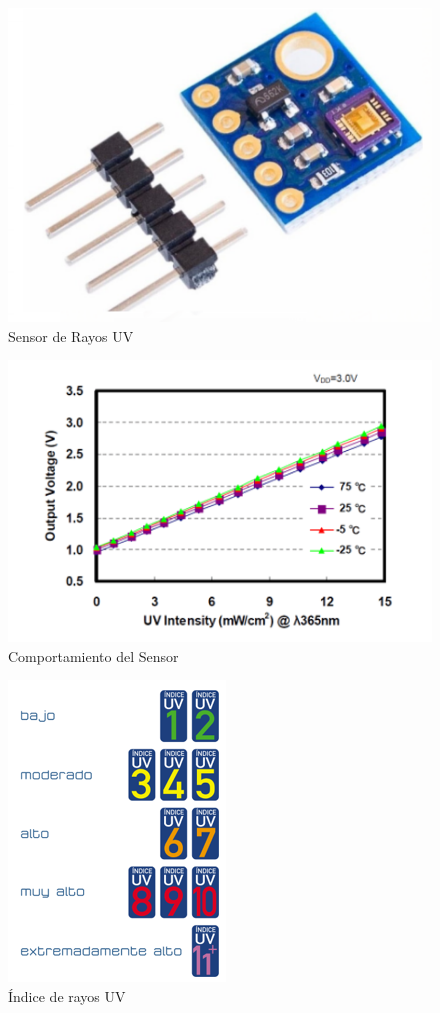 \documentclass[10pt,a4paper]{article}
\begin{document}
\begin{multicols}{2}
\begin{itemize}
\begin{figure}[H]
\centering
\includegraphics[scale=0.3]{Captura1.PNG}
\caption{Sensor de Rayos UV}
\end{figure}

\begin{figure}[H]
\centering
\includegraphics[scale=0.9]{indiceuv.PNG}
\caption{Comportamiento del Sensor}
\end{figure}

\begin{figure}[H]
\centering
\includegraphics[scale=1]{uvindice.PNG}
\caption{Índice de rayos UV}
\end{figure}



\end{itemize}
\end{multicols}
\end{document}
